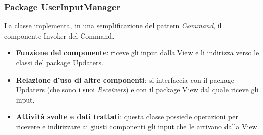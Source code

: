 \documentclass[a4paper,11pt]{article}
\begin{document}
			\subsubsection{Package UserInputManager}

			La classe implementa, in una semplificazione del pattern \emph{Command}, il componente Invoker del Command.
			\begin{itemize}
				\item\textbf{Funzione del componente}: riceve gli input dalla View e li indirizza verso le classi del package Updaters.
				\item\textbf{Relazione d'uso di altre componenti}: si interfaccia con il package Updaters (che sono i suoi \emph{Receivers}) e con il package View dal quale riceve gli input.
				\item\textbf{Attività svolte e dati trattati}: questa classe possiede operazioni per ricevere e indirizzare ai giusti componenti gli input che le arrivano dalla View.
			\end{itemize}
			
\end{document}
